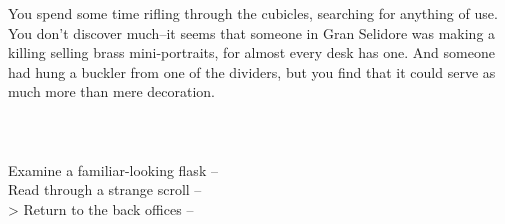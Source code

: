 You spend some time rifling through the cubicles, searching for anything of use. You don’t discover much--it seems that someone in Gran Selidore was making a killing selling brass mini-portraits, for almost every desk has one. And someone had hung a buckler from one of the dividers, but you find that it could serve as much more than mere decoration.\\
\\
\\
\\

 Examine a familiar-looking flask -- \\
 Read through a strange scroll -- \\
> Return to the back offices -- 
